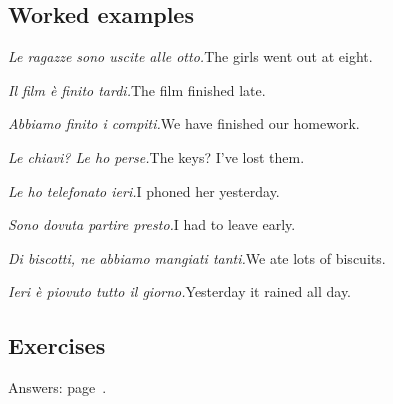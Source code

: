\documentclass[11pt,a4paper,twoside,openright]{book}
\begin{document}
\subsection*{Worked examples}
\begin{examples}
\item\relax \textit{Le ragazze sono uscite alle otto.}\newline The girls went out at eight.
\item\relax \textit{Il film è finito tardi.}\newline The film finished late.
\item\relax \textit{Abbiamo finito i compiti.}\newline We have finished our homework.
\item\relax \textit{Le chiavi? Le ho perse.}\newline The keys? I've lost them.
\item\relax \textit{Le ho telefonato ieri.}\newline I phoned her yesterday.
\item\relax \textit{Sono dovuta partire presto.}\newline I had to leave early.
\item\relax \textit{Di biscotti, ne abbiamo mangiati tanti.}\newline We ate lots of biscuits.
\item\relax \textit{Ieri è piovuto tutto il giorno.}\newline Yesterday it rained all day.
\end{examples}

\subsection*{Exercises}\label{les:ausiliari-accordo:exercises}
{\color{muted}\small Answers: page~\pageref{ans:ausiliari-accordo}.}
\end{document}
